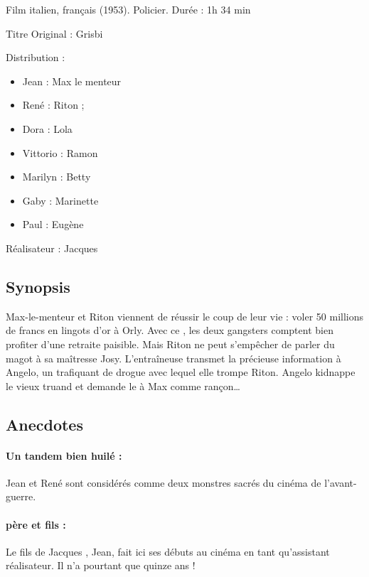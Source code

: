 {Film italien, français (1953). Policier. Durée : 1h 34 min

Titre Original : Grisbi

Distribution :

\begin{itemize}
	\item Jean  : Max le menteur	
	\item René  : Riton ;
	\item Dora  : Lola	
	\item Vittorio  : Ramon	
	\item Marilyn  : Betty	
	\item Gaby  : Marinette	
	\item Paul  : Eugène
\end{itemize}

Réalisateur : Jacques 


\subsection*{Synopsis}

Max-le-menteur et Riton viennent de réussir le coup de leur vie : voler 50
millions de francs en lingots d'or à Orly. Avec ce , les deux
gangsters comptent bien profiter d'une retraite paisible. Mais Riton ne peut
s'empêcher de parler du magot à sa maîtresse Josy. L'entraîneuse transmet la
précieuse information à Angelo, un trafiquant de drogue avec lequel elle trompe Riton. Angelo kidnappe le vieux truand et demande le  à Max comme rançon\dots


\subsection*{Anecdotes}

\paragraph{Un tandem bien huilé :} Jean  et René 
 sont considérés comme deux monstres sacrés du cinéma de
l'avant-guerre.

\paragraph{ père et fils :} Le fils de Jacques 
, Jean, fait ici ses débuts au cinéma en tant qu'assistant
réalisateur. Il n'a pourtant que quinze ans !

}
